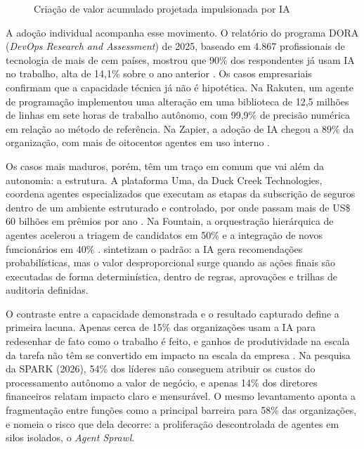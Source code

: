 \begin{figure}[htb]
\centering
\caption{Criação de valor acumulado projetada impulsionada por IA}
\label{fig:1}
\end{figure}

A adoção individual acompanha esse movimento. O relatório do programa DORA (\textit{DevOps Research and Assessment}) de 2025, baseado em 4.867 profissionais de tecnologia de mais de cem países, mostrou que 90\% dos respondentes já usam IA no trabalho, alta de 14,1\% sobre o ano anterior \cite{dora2025}. Os casos empresariais confirmam que a capacidade técnica já não é hipotética. Na Rakuten, um agente de programação implementou uma alteração em uma biblioteca de 12,5 milhões de linhas em sete horas de trabalho autônomo, com 99,9\% de precisão numérica em relação ao método de referência. Na Zapier, a adoção de IA chegou a 89\% da organização, com mais de oitocentos agentes em uso interno \cite{anthropic2026trends}.

Os casos mais maduros, porém, têm um traço em comum que vai além da autonomia: a estrutura. A plataforma Uma, da Duck Creek Technologies, coordena agentes especializados que executam as etapas da subscrição de seguros dentro de um ambiente estruturado e controlado, por onde passam mais de US\$ 60 bilhões em prêmios por ano \cite{vista2026outlook}. Na Fountain, a orquestração hierárquica de agentes acelerou a triagem de candidatos em 50\% e a integração de novos funcionários em 40\% \cite{anthropic2026trends}.  sintetizam o padrão: a IA gera recomendações probabilísticas, mas o valor desproporcional surge quando as ações finais são executadas de forma determinística, dentro de regras, aprovações e trilhas de auditoria definidas.

O contraste entre a capacidade demonstrada e o resultado capturado define a primeira lacuna. Apenas cerca de 15\% das organizações usam a IA para redesenhar de fato como o trabalho é feito, e ganhos de produtividade na escala da tarefa não têm se convertido em impacto na escala da empresa \cite{wef2026organizational}. Na pesquisa da SPARK (2026)\nocite{spark2026cio}, 54\% dos líderes não conseguem atribuir os custos do processamento autônomo a valor de negócio, e apenas 14\% dos diretores financeiros relatam impacto claro e mensurável. O mesmo levantamento aponta a fragmentação entre funções como a principal barreira para 58\% das organizações, e nomeia o risco que dela decorre: a proliferação descontrolada de agentes em silos isolados, o \textit{Agent Sprawl}.

